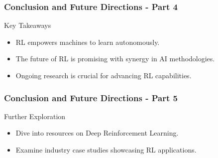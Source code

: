 \documentclass{beamer}
\begin{document}
\begin{frame}[fragile]
    \frametitle{Conclusion and Future Directions - Part 4}
    \begin{block}{Key Takeaways}
        \begin{itemize}
            \item RL empowers machines to learn autonomously.
            \item The future of RL is promising with synergy in AI methodologies.
            \item Ongoing research is crucial for advancing RL capabilities.
        \end{itemize}
    \end{block}
\end{frame}

\begin{frame}[fragile]
    \frametitle{Conclusion and Future Directions - Part 5}
    \begin{block}{Further Exploration}
        \begin{itemize}
            \item Dive into resources on Deep Reinforcement Learning.
            \item Examine industry case studies showcasing RL applications.
        \end{itemize}
    \end{block}
\end{frame}
\end{document}
